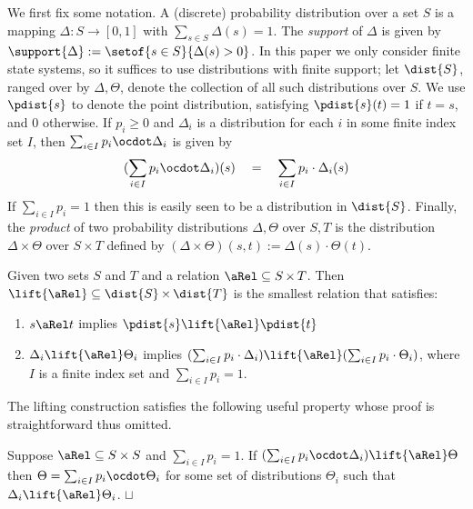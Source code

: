\documentclass{article}
\def\squareforqed{\hbox{\rlap{$\sqcap$}$\sqcup$}}
\def\qed{\ifmmode\squareforqed\else{\unskip\nobreak\hfil
\penalty50\hskip1em\null\nobreak\hfil\squareforqed
\parfillskip=0pt\finalhyphendemerits=0\endgraf}\fi}
\begin{document}
We first fix some notation. A (discrete) probability
distribution over a set $S$ is a
mapping \mbox{$\Delta: S \rightarrow [0,1]$} with $\sum_{s\in
S}\Delta(s)=1$. The \emph{support} of $\Delta$ is
given by $\support{\Delta} := \setof{s \in S}{\Delta(s) > 0}$. In
this paper we only consider finite state systems, so it suffices to
use distributions with finite support; let $\dist{S}$, ranged over
by $\Delta, \Theta$, denote the collection of all such distributions
over $S$.  We use $\pdist{s}$ to denote the point distribution,
satisfying $\pdist{s}(t)=1$ if $t=s$, and $0$ otherwise. If $p_i\geq
0$ and $\Delta_i$ is a distribution for each $i$ in some finite
index set $I$, then $\sum_{i \in I}p_i \ocdot \Delta_i$ is  given by
\begin{equation*}
  (\sum_{i \in I}p_i \ocdot \Delta_i)(s) ~~~=~~~ \sum_{i \in I} p_i \cdot\Delta_i(s)
\end{equation*}
If $\sum_{i \in I} p_i = 1$ then this is easily seen to be a
distribution in $\dist{S}$.
Finally, the
\emph{product} of two probability distributions
$\Delta,\Theta$ over $S,T$ is the distribution $\Delta\times\Theta$
over $S\times T$ defined by
$(\Delta\times\Theta)(s,t):=\Delta(s)\cdot\Theta(t)$.


\begin{definition}\label{d:lifting}
Given two sets $S$ and $T$ and a relation $\mathord{\aRel} \subseteq
S \mathop{\times} T$. Then $\mathord{\lift{\aRel}} \subseteq
\dist{S} \mathop{\times} \dist{T}$ is the smallest relation that
satisfies:
\begin{enumerate}
\item
$s\aRel t$ implies $\pdist{s}\lift{\aRel}\pdist{t}$

\item
$\Delta_i\lift{\aRel}\Theta_i$ implies $(\sum_{i\in
I}p_i\cdot\Delta_i)\lift{\aRel} (\sum_{i\in I}p_i\cdot\Theta_i)$,
where $I$ is a finite index set and  $\sum_{i\in I}{p_i} = 1$.
\end{enumerate}
\end{definition}

The lifting construction satisfies the following  useful property
whose proof is straightforward thus omitted.
\begin{proposition}\rm\label{prop:lifting}
Suppose $\mathord{\aRel}\subseteq S\times S$ and
 $\sum_{i\in I} p_i = 1$. If $(\sum_{i\in I}{p_i \ocdot \Delta_i}) \lift{\aRel} \Theta$ then
$\Theta = \sum_{i\in I}{p_i \ocdot \Theta_i}$  for some set of
distributions $\Theta_i$ such that $\Delta_i \lift{\aRel} \Theta_i$.
\hfill\qed
\end{proposition}
\end{document}
